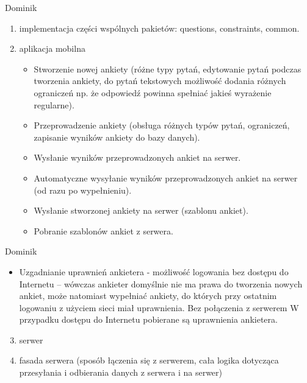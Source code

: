 \documentclass[a4paper,10pt]{beamer}
\begin{document}
		\begin{frame}{Dominik}
			\begin{enumerate}
				\item	implementacja części wspólnych pakietów: questions, constraints, common.
				\item	aplikacja mobilna
				\begin{itemize}
					\item Stworzenie nowej ankiety (różne typy pytań, edytowanie pytań podczas tworzenia ankiety, do pytań tekstowych możliwość dodania różnych ograniczeń np. że odpowiedź powinna spełniać jakieś wyrażenie regularne).
					\item	Przeprowadzenie ankiety (obsługa różnych typów pytań, ograniczeń, zapisanie wyników ankiety do bazy danych).
					\item	Wysłanie wyników przeprowadzonych ankiet na serwer.
					\item	Automatyczne wysyłanie wyników przeprowadzonych ankiet na serwer (od razu po wypełnieniu).
					\item	Wysłanie stworzonej ankiety na serwer (szablonu ankiet).
					\item	Pobranie szablonów ankiet z serwera.
				\end{itemize}
			\end{enumerate}
		\end{frame}
		\begin{frame}{Dominik}
				\begin{itemize}
					\item	Uzgadnianie uprawnień ankietera - możliwość logowania bez dostępu do Internetu – wówczas ankieter domyślnie nie ma prawa do tworzenia nowych ankiet, może natomiast wypełniać ankiety, do których przy ostatnim logowaniu z użyciem sieci miał uprawnienia. Bez połączenia z serwerem  W przypadku dostępu do Internetu pobierane są uprawnienia ankietera.
				\end{itemize}
		\begin{enumerate}
			\setcounter{enumi}{2}	
				\item	serwer
				\item	fasada serwera (sposób łączenia się z serwerem, cała logika dotycząca przesyłania i odbierania danych z serwera i na serwer)
		\end{enumerate}
		\end{frame}
\end{document}
